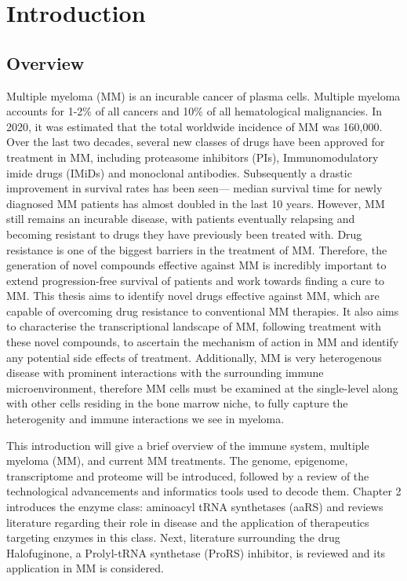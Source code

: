 \chapter{\label{ch:1-intro}Introduction} 


\section{Overview}
Multiple myeloma (MM) is an incurable cancer of plasma cells.
Multiple myeloma accounts for 1-2\% of all cancers and 10\% of all hematological malignancies\cite{international2003criteria}.
In 2020, it was estimated that the total worldwide incidence of MM was 160,000\cite{ludwig2020multiple}.
Over the last two decades, several new classes of drugs have been approved for treatment in MM, including proteasome inhibitors (PIs), Immunomodulatory imide drugs (IMiDs) and monoclonal antibodies.
Subsequently a drastic improvement in survival rates has been seen--- median survival time for newly diagnosed MM patients has almost doubled in the last 10 years\cite{kazandjian2016look}.
However, MM still remains an incurable disease, with patients eventually relapsing and becoming resistant to drugs they have previously been treated with.
Drug resistance is one of the biggest barriers in the treatment of MM.
Therefore, the generation of novel compounds effective against MM is incredibly important to extend progression-free survival of patients and work towards finding a cure to MM\@.
This thesis aims to identify novel drugs effective against MM, which are capable of overcoming drug resistance to conventional MM therapies.
It also aims to characterise the transcriptional landscape of MM, following treatment with these novel compounds, to ascertain the mechanism of action in MM and identify any potential side effects of treatment.
Additionally, MM is very heterogenous disease with prominent interactions with the surrounding immune microenvironment, therefore MM cells must be examined at the single-level along with other cells residing in the bone marrow niche, to fully capture the heterogenity and immune interactions we see in myeloma.

This introduction will give a brief overview of the immune system, multiple myeloma (MM), and current MM treatments.
The genome, epigenome, transcriptome and proteome will be introduced, followed by a review of the technological advancements and informatics tools used to decode them.
Chapter 2 introduces the enzyme class: aminoacyl tRNA synthetases (aaRS) and reviews literature regarding their role in disease and the application of therapeutics targeting enzymes in this class.
Next, literature surrounding the drug Halofuginone, a Prolyl-tRNA synthetase (ProRS) inhibitor, is reviewed and its application in MM is considered.

